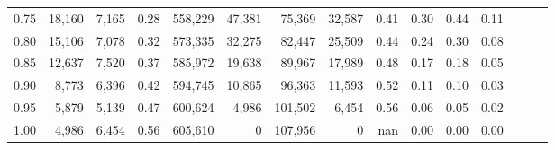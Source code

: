 \begin{tabular}{rrrrrrrrrrrrrrr}
0.75 &  18,160 &  7,165 &  0.28 &  558,229 &   47,381 &   75,369 &   32,587 &  0.41 &  0.30 &  0.44 &      0.11 \\
0.80 &  15,106 &  7,078 &  0.32 &  573,335 &   32,275 &   82,447 &   25,509 &  0.44 &  0.24 &  0.30 &      0.08 \\
0.85 &  12,637 &  7,520 &  0.37 &  585,972 &   19,638 &   89,967 &   17,989 &  0.48 &  0.17 &  0.18 &      0.05 \\
0.90 &   8,773 &  6,396 &  0.42 &  594,745 &   10,865 &   96,363 &   11,593 &  0.52 &  0.11 &  0.10 &      0.03 \\
0.95 &   5,879 &  5,139 &  0.47 &  600,624 &    4,986 &  101,502 &    6,454 &  0.56 &  0.06 &  0.05 &      0.02 \\
1.00 &   4,986 &  6,454 &  0.56 &  605,610 &        0 &  107,956 &        0 &   nan &  0.00 &  0.00 &      0.00 \\
\bottomrule
\end{tabular}
